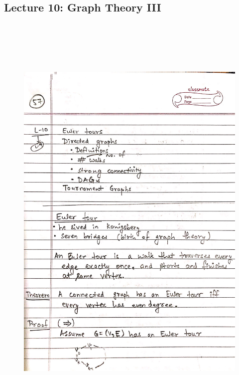 \newpage
{\color{black} \subsection*{Lecture 10: Graph Theory III}}
\begin{figure}[H]
    \centering
    \includegraphics[width=16cm, height=21cm]{"./MIT-6.042J/MIT-6042J-057"}
\end{figure}

